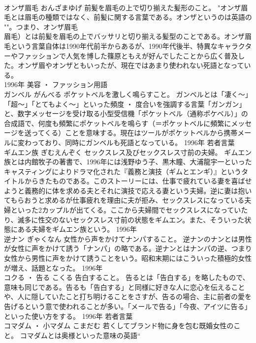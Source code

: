 \documentclass[8pt]{extreport}
\begin{document}
\begin{CJK}{UTF8}{min}
\\	オンザ眉毛	おんざまゆげ	前髪を眉毛の上で切り揃えた髪形のこと。	"オンザ眉毛とは眉毛の種類ではなく、前髪に関する言葉である。オンザというのは英語の
\\	""。つまり、オンザ眉毛
\\	眉毛）とは前髪を眉毛の上でバッサリと切り揃える髪型のことである。オンザ眉毛という言葉自体は1990年代前半からあるが、1990年代後半、特異なキャラクターやファッションで人気を博した篠原ともえが好んでしたことから広く普及した。オンザ眉やオンザともいったが、現在ではあまり使われない死語となっている。
\\	1996年	美容 ・ ファッション用語	
\\	ガンベル	がんべる	ポケットベルを激しく鳴らすこと。	ガンベルとは「凄く～」「超～」「とてもよく～」といった頻度 ・ 度合いを強調する言葉「ガンガン」と、数字メッセージを受け取る小型受信機「ポケットベル（通称ポケベル）」の合成語で、何度も頻繁にポケットベルを鳴らす（＝ポケットベルに頻繁にメッセージを送ってくる）ことを意味する。現在はツールがポケットベルから携帯メールに変わっており、同時にガンベルも死語となっている。	1996年	若者言葉	
\\	ギムエン族	ぎむえんぞく	セックスレス及びセックスレス寸前の夫婦。	ギムエン族とは内館牧子の著書で、1996年には浅野ゆう子、黒木瞳、大浦龍宇一といったキャスティングによりドラマ化された『義務と演技（ギムとエンギ）』というタイトルからきたものである。このストーリーには、仕事で疲れている妻を喜ばせようと義務的に体を求める夫とそれに演技で応える妻という夫婦。逆に妻は抱いてもらおうと求めるが仕事疲れを理由に夫が拒み、セックスレスになっている夫婦といった2カップルが出てくる。ここから夫婦間でセックスレスになっていたり、滅多に性交のないセックスレス寸前の状態をギムエン。また、そういった状態にある夫婦をギムエン族という。	1996年	
\\	逆ナン	ぎゃくなん	女性から声をかけてナンパすること。	逆ナンのナンとは男性が女性に声をかけて誘う「ナンパ」の略である。逆ナンとはナンパの逆、つまり女性から男性に声をかけて誘うことをいう。昭和末期にはこういった積極的女性が増え、話題となった。	1996年	
\\	コクる ・ 告る	こくる	告白すること。	告るとは「告白する」を略したもので、意味も同じである。告るも「告白する」と同様に好きな人に恋心を伝えることや、人に隠していたこと打ち明けることをさすが、告るの場合、主に前者の愛を告げるという意で使われることが多い。「メールで告る」「今夜、アイツに告る」といった使い方をする。	1996年	若者言葉	
\\	コマダム ・ 小マダム	こまだむ	若くしてブランド物に身を包む既婚女性のこと。	コマダムとは奥様といった意味の英語“

\end{CJK}
\end{document}
